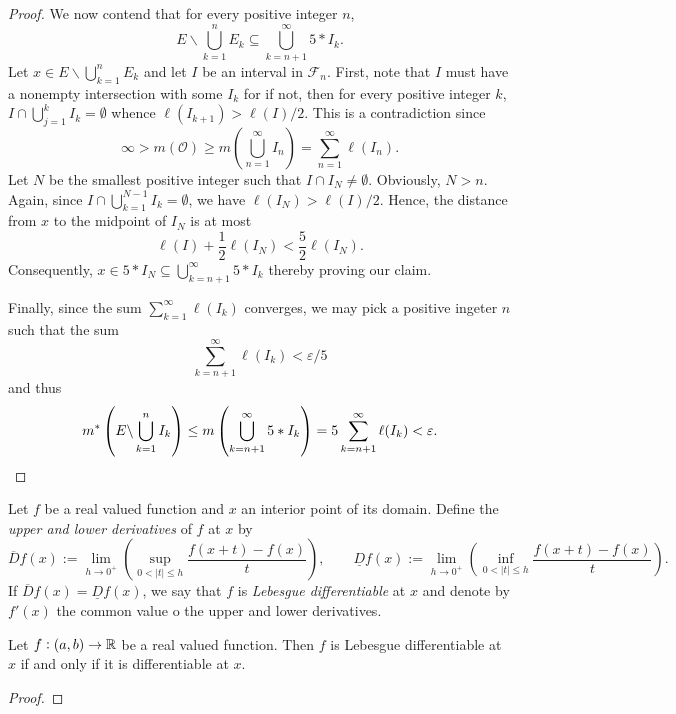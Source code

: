 \begin{proof}
    We now contend that for every positive integer $n$, 
    \begin{equation*}
        E\backslash\bigcup_{k = 1}^n E_k\subseteq\bigcup_{k = n + 1}^\infty 5 * I_k.
    \end{equation*}
    Let $x\in E\backslash\bigcup_{k = 1}^n E_k$ and let $I$ be an interval in $\mathcal F_n$. First, note that $I$ must have a nonempty intersection with some $I_k$ for if not, then for every positive integer $k$, $I\cap\bigcup_{j = 1}^k I_k = \emptyset$ whence $\ell(I_{k + 1}) > \ell(I)/2$. This is a contradiction since 
    \begin{equation*}
        \infty > m(\mathcal O)\ge m\left(\bigcup_{n = 1}^\infty I_n\right) = \sum_{n = 1}^\infty\ell(I_n).
    \end{equation*}
    Let $N$ be the smallest positive integer such that $I\cap I_N\ne\emptyset$. Obviously, $N > n$. Again, since $I\cap\bigcup_{k = 1}^{N - 1} I_k = \emptyset$, we have $\ell(I_N) > \ell(I)/2$. Hence, the distance from $x$ to the midpoint of $I_N$ is at most 
    \begin{equation*}
        \ell(I) + \frac{1}{2}\ell(I_N) < \frac{5}{2}\ell(I_N).
    \end{equation*}
    Consequently, $x\in 5 * I_N\subseteq\bigcup_{k = n + 1}^\infty 5 * I_k$ thereby proving our claim.

    Finally, since the sum $\sum_{k = 1}^\infty\ell(I_k)$ converges, we may pick a positive ingeter $n$ such that the sum $$\sum_{k = n + 1}^\infty\ell(I_k) < \varepsilon/5$$ and thus 
    \begin{equation*}
        m^*\left(E\backslash\bigcup_{k = 1}^n I_k\right)\le m\left(\bigcup_{k = n + 1}^\infty 5 * I_k\right) = 5\sum_{k = n + 1}^\infty\ell(I_k) < \varepsilon.\qedhere
    \end{equation*}
\end{proof}

\begin{definition}
    Let $f$ be a real valued function and $x$ an interior point of its domain. Define the \emph{upper and lower derivatives} of $f$ at $x$ by 
    \begin{equation*}
        \overline Df(x) := \lim_{h\to 0^+}\left(\sup_{0 < |t|\le h}\frac{f(x + t) - f(x)}{t}\right),\qquad
        \underline Df(x) := \lim_{h\to 0^+}\left(\inf_{0 < |t|\le h}\frac{f(x + t) - f(x)}{t}\right).
    \end{equation*}
    If $\overline Df(x) = \underline Df(x)$, we say that $f$ is \emph{Lebesgue differentiable} at $x$ and denote by $f'(x)$ the common value o the upper and lower derivatives.
\end{definition}

\begin{proposition}
    Let $f:(a,b)\to\mathbb{R}$ be a real valued function. Then $f$ is Lebesgue differentiable at $x$ if and only if it is differentiable at $x$.
\end{proposition}
\begin{proof}
    
\end{proof}